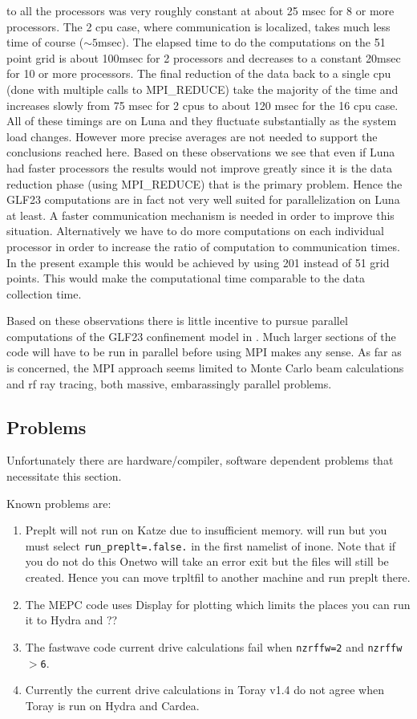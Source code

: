 to all  the processors was very roughly constant at about 25 msec  for 8 or more
processors. The  2 cpu case, where communication is localized, takes much less
time of course ($\sim 5$msec). The elapsed time to do the computations on the 51
point grid is about 100msec for 2 processors and decreases to a constant 20msec
for 10 or more processors. The final reduction of the data back to a single cpu
(done  with multiple calls to MPI\_REDUCE) take the majority of the time and
increases slowly from 75 msec for 2 cpus to about 120 msec for the 16 cpu case.
All of these timings are on Luna and they fluctuate substantially as the system
load  changes. However more precise averages are not needed to support the
conclusions reached here.  Based on these observations we see that even if  Luna
had faster processors the results would not improve greatly since it is the 
data reduction phase (using MPI\_REDUCE)  that is the primary problem. Hence the
GLF23 computations are in fact not very well suited for parallelization on Luna
at least. A faster communication mechanism is needed in order to improve this
situation.  Alternatively we have to do more computations on each individual
processor in order to increase the ratio  of computation to communication times.
In the present example this would   be achieved by using 201 instead of 51 grid
points. This would make the computational time comparable to the data collection
time. 

Based on these observations there is little incentive to pursue parallel
computations of the GLF23 confinement model in \ot.  Much larger sections of the
code will have to be run in parallel before using MPI makes any sense. As far as
\ot is concerned, the MPI approach  seems limited to Monte Carlo beam
calculations and rf ray tracing, both massive, embarassingly parallel
problems.   

\subsection{Problems}

Unfortunately there are hardware/compiler, software dependent problems that
necessitate this section.

Known problems are: 
\begin{enumerate}
 \item Preplt will not run on Katze due to insufficient memory.
 \ot will run  but you must select \texttt{run\_preplt=.false.}
 in the first namelist of inone. Note that if you do not do
 this Onetwo will take an error exit but the files will still
 be created. Hence you can move trpltfil to another machine
 and run preplt there.
 \item The MEPC code uses Display for plotting which limits the
 places you can run it to Hydra and ??
 \item The fastwave code current drive calculations fail when 
 \texttt{nzrffw=2} and \texttt{nzrffw$>$6}.
 \item Currently the current drive calculations in Toray v1.4 do
 not agree when Toray is run on Hydra and Cardea.
\end{enumerate}
